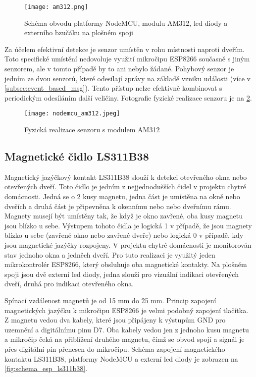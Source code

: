 \begin{figure}[H]
  \centering
  \texttt{[image: am312.png]}
  \caption{Schéma obvodu platformy NodeMCU, modulu AM312, led diody a externího bzučáku na plošném spoji}
  \label{fig:schema_esp_am312}
\end{figure}

Za účelem efektivní detekce je senzor umístěn v rohu místnosti naproti dveřím. Toto specifické umístění nedovoluje využití mikročipu ESP8266 současně s jiným senzorem, ale v tomto případě by to ani nebylo žádané. Pohybový senzor je jedním ze dvou senzorů, které odesílají zprávy na základě vzniku události (více v \cref{subsec:event_based_msg}). Tento přístup nelze efektivně kombinovat s periodickým odesíláním další veličiny. Fotografie fyzické realizace senzoru je na \cref{fig:nodemcu_am312}.

\begin{figure}[H]
  \centering
  \texttt{[image: nodemcu\_am312.jpeg]}
  \caption{Fyzická realizace senzoru s modulem AM312}
  \label{fig:nodemcu_am312}
\end{figure} 

\subsection{Magnetické čidlo LS311B38}
Magnetický jazýčkový kontakt LS311B38 slouží k detekci otevřeného okna nebo otevřených dveří. Toto čidlo je jedním z nejjednodušších čidel v projektu chytré domácnosti. Jedná se o 2 kusy magnetu, jedna část je umístěna na okně nebo dveřích a druhá část je připevněna k okennímu nebo nebo \mbox{dveřnímu} rámu. Magnety musejí být umístěny tak, že když je okno zavřené, oba kusy magnetu jsou blízko u sebe. Výstupem tohoto čidla je logická 1 v případě, že jsou magnety blízko u sebe (zavřené okno nebo zavřené dveře) nebo logická 0 v případě, kdy jsou magnetické jazýčky rozpojeny. V projektu chytré domácnosti je monitorován stav jednoho okna a jedněch dveří. Pro tuto realizaci je využitý jeden mikrokontrolér ESP8266, který obsluhuje oba magnetické kontakty. Na plošném spoji jsou dvě externí led diody, jedna slouží pro vizuální indikaci otevřených dveří, druhá pro indikaci otevřeného okna. \par
Spínací vzdálenost magnetů je od 15 mm do 25 mm. Princip zapojení magnetických jazýčku k mikročipu ESP8266 je velmi podobný zapojení tlačítka. Z magnetu vedou dva kabely, které jsou připájeny k výstupům GND pro uzemnění a digitálnímu pinu D7. Oba kabely vedou jen z jednoho kusu magnetu a mikročip čeká na přiblížení druhého magnetu, čímž se obvod spojí a signál je přes digitální pin přenesen do mikročipu. Schéma zapojení magnetického kontaktu LS311B38, platformy NodeMCU a externí led diody je zobrazen na \cref{fig:schema_esp_ls311b38}.

